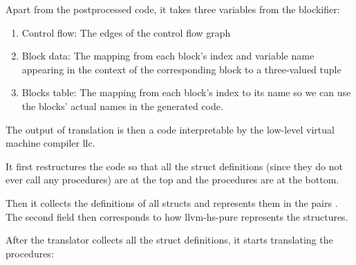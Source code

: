 Apart from the postprocessed code, it takes three variables from the blockifier:


\begin{enumerate}
    \item Control flow: The edges of the control flow graph
    \item Block data: The mapping from each block's index and variable name appearing in the context of the corresponding block to a three-valued tuple \linebreak {}
    \item Blocks table: The mapping from each block's index to its name so we can use the blocks' actual names in the generated code.
\end{enumerate}

The output of translation is then a code interpretable by the low-level virtual machine compiler llc.

It first restructures the code so that all the struct definitions (since they do not ever call any procedures) are at the top and the procedures are at the bottom.

Then it collects the definitions of all structs and represents them in the pairs \linebreak {}. The second field then corresponds to how llvm-hs-pure represents the structures.

After the translator collects all the struct definitions, it starts translating the procedures:

